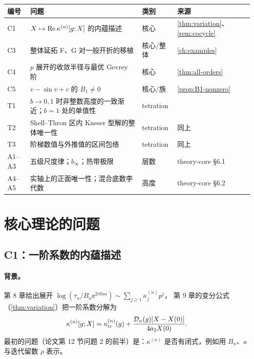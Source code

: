 \begin{center}\small
\begin{tabular}{llll}
\toprule
编号 & 问题 & 类别 & 来源\\
\midrule
C1 & $X\mapsto\operatorname{Re}\kappa^{(n)}[g;X]$ 的内蕴描述 & 核心 & \cref{thm:variation}、\cref{rem:cocycle}\\
C3 & 整体延拓 F、G 对一般开折的移植 & 核心/整体 & \cref{ch:examples}\\
C4 & $p$ 展开的收敛半径与最优 Gevrey 阶 & 核心 & \cref{thm:all-orders}\\
C5 & $v-\sin v+c$ 的 $B_1\neq0$ & 核心/族 & \cref{prop:B1-nonzero}\\
T1 & $b\to0,1$ 时非整数高度的一致渐近；$b=1$ 处的单值性 & tetration & \cite[第~12~节]{KneserPaper}\\
T2 & Shell--Thron 区内 Kneser 型解的整体唯一性 & tetration & 同上\\
T3 & 阶梯数值与外推值的区间包络 & tetration & 同上\\
A1--A3 & 五级尺度律；$b_\infty$；热带极限 & 层数 & theory-core §6.1\\
A4--A5 & 实轴上的正面唯一性；混合底数李代数 & 高度 & theory-core §6.2\\
\bottomrule
\end{tabular}
\end{center}

\section{核心理论的问题}\label{ch12:sec:core}

\subsection{C1：一阶系数的内蕴描述}\label{ch12:sec:C1}

\paragraph{背景。}第 8 章给出展开 $\log(\tau_n/B_n\ee^{2\pi\ii na})\sim\sum_{j\ge1}\kappa^{(n)}_jp^j$，
第 9 章的变分公式（\cref{thm:variation}）把一阶系数分解为
\begin{equation}\label{ch12:eq:variation}
  \kappa^{(n)}[g;X]=\kappa_{\mathrm{tr}}^{(n)}(g)+\frac{\mathcal D_n(g)[X-X(0)]}{4a_2X(0)} .
\end{equation}
最初的问题（论文第 12 节问题 2 的前半）是：$\kappa^{(n)}$ 是否有闭式，例如用 $B_n$、$a$ 与迭代留数 $\rho$ 表示。

